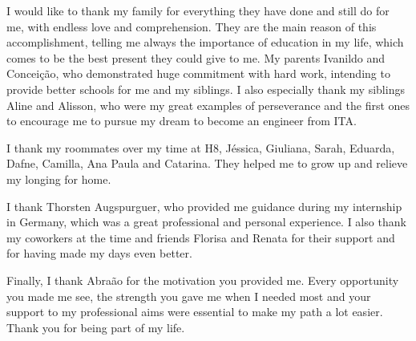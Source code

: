 	I would like to thank my family for everything they have done and still do for me, with endless love and comprehension. They are the main reason of this accomplishment, telling me always the importance of education in my life, which comes to be the best present they could give to me. My parents Ivanildo and Concei\c{c}{\~a}o, who demonstrated huge commitment with hard work, intending to provide better schools for me and my siblings. I also especially thank my siblings Aline and Alisson, who were my great examples of perseverance and the first ones to encourage me to pursue my dream to become an engineer from ITA.

	I thank my roommates over my time at H8, J\'essica, Giuliana, Sarah, Eduarda, Dafne, Camilla, Ana Paula and Catarina. They helped me to grow up and relieve my longing for home.

	I thank Thorsten Augspurguer, who provided me guidance during my internship in Germany, which was a great professional and personal experience. I also thank my coworkers at the time and friends Florisa and Renata for their support and for having made my days even better.

	Finally, I thank Abra{\~a}o for the motivation you provided me. Every opportunity you made me see, the strength you gave me when I needed most and your support to my professional aims were essential to make my path a lot easier. Thank you for being part of my life.